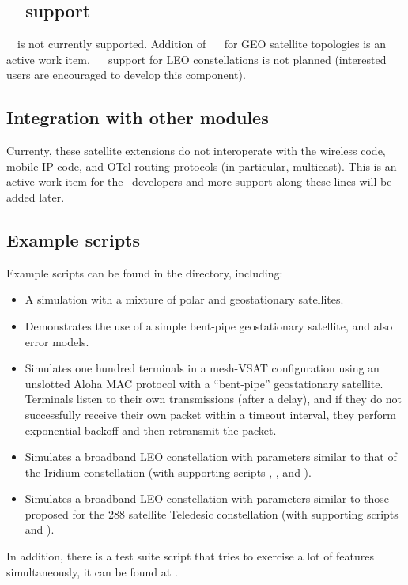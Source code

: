 
\subsection{\nam~~support}
\label{sec:satellite/usage/nam}
\nam~~is not currently supported.  Addition of \nam~~ for GEO satellite
topologies is an active work item.  \nam~~ support for LEO constellations is
not planned (interested users are encouraged to develop this component).


\subsection{Integration with other modules}
\label{sec:satellite/usage/integration}
Currenty, these satellite extensions do not interoperate with the wireless
code, mobile-IP code, and OTcl routing protocols (in particular, multicast).
This is an active work item for the \ns~developers and more support along
these lines will be added later.


\subsection{Example scripts}
\label{sec:satellite/usage/example}

Example scripts can be found in the  directory, including:
\begin{itemize}
\item {}  A simulation with a mixture of polar and
geostationary satellites.
\item {}  Demonstrates the use of a simple bent-pipe
geostationary satellite, and also error models.
\item {}  Simulates one hundred terminals in a mesh-VSAT
configuration using an unslotted Aloha MAC protocol 
with a ``bent-pipe'' geostationary satellite.  Terminals listen to their
own transmissions (after a delay), and if they do not successfully receive
their own packet within a timeout interval, they perform exponential 
backoff and then retransmit the packet. 
\item {}  Simulates a broadband LEO constellation with
parameters similar to that of the Iridium constellation (with supporting
scripts , , 
and ).
\item {}  Simulates a broadband LEO constellation with
parameters similar to those proposed for the 288 satellite Teledesic
constellation (with supporting scripts  and 
).
\end{itemize}
In addition, there is a test suite script that tries to exercise a lot
of features simultaneously, it can be found at .


